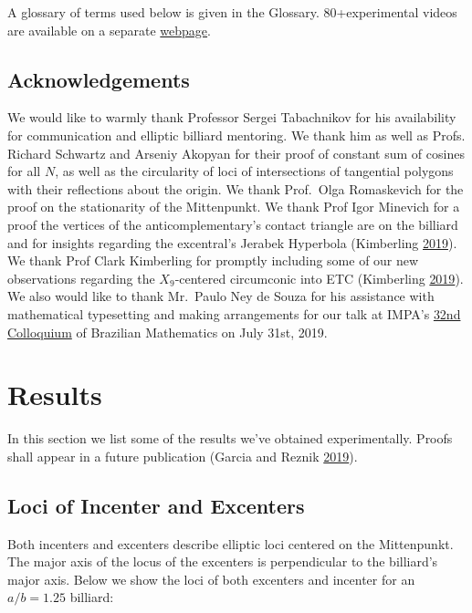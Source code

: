 \documentclass[]{article}
\begin{document}
A glossary of terms used below is given in the Glossary. 80+experimental videos are available on a separate \href{videos.html}{webpage}.

\hypertarget{acknowledgements}{%
\subsection{Acknowledgements}\label{acknowledgements}}

We would like to warmly thank Professor Sergei Tabachnikov for his availability for communication and elliptic billiard mentoring. We thank him as well as Profs. Richard Schwartz and Arseniy Akopyan for their proof of constant sum of cosines for all \(N\), as well as the circularity of loci of intersections of tangential polygons with their reflections about the origin. We thank Prof.~Olga Romaskevich for the proof on the stationarity of the Mittenpunkt. We thank Prof Igor Minevich for a proof the vertices of the anticomplementary's contact triangle are on the billiard and for insights regarding the excentral's Jerabek Hyperbola (Kimberling \protect\hyperlink{ref-etc}{2019}). We thank Prof Clark Kimberling for promptly including some of our new observations regarding the \(X_{9}\)-centered circumconic into ETC (Kimberling \protect\hyperlink{ref-etc}{2019}). We also would like to thank Mr.~Paulo Ney de Souza for his assistance with mathematical typesetting and making arrangements for our talk at IMPA's \href{https://impa.br/eventos-do-impa/eventos-2019/32o-coloquio-brasileiro-de-matematica}{32nd Colloquium} of Brazilian Mathematics on July 31st, 2019.

\hypertarget{results}{%
\section{Results}\label{results}}

In this section we list some of the results we've obtained experimentally. Proofs shall appear in a future publication (Garcia and Reznik \protect\hyperlink{ref-garcia19a}{2019}).

\hypertarget{loci-of-incenter-and-excenters}{%
\subsection{Loci of Incenter and Excenters}\label{loci-of-incenter-and-excenters}}

Both incenters and excenters describe elliptic loci centered on the Mittenpunkt. The major axis of the locus of the excenters is perpendicular to the billiard's major axis. Below we show the loci of both excenters and incenter for an \(a/b=1.25\) billiard:
\end{document}
